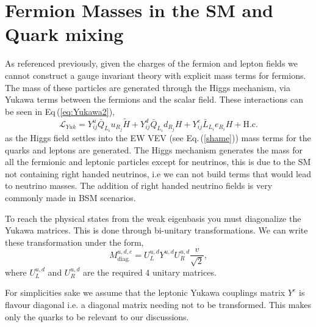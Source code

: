 \renewcommand{\cleardoublepage}{}
\renewcommand{\clearpage}{}

\section{Fermion Masses in the SM and Quark mixing}
\label{Chap_1_Sec_3}

As referenced previously, given the charges of the fermion and lepton fields we cannot construct a gauge invariant theory with explicit mass terms for fermions. 
%
The mass of these particles are generated through the Higgs mechanism, via Yukawa terms between the fermions and the scalar field. 
%
These interactions can be seen in Eq\,(\ref{eq:Yukawa2}), 
%
\begin{equation} 
\label{eq:Yukawa2}
\mathcal{L}_{Yuk} = Y^u_{ij} \bar{Q}_{L_i} u_{R_j}  \tilde{H} + Y^d_{ij} \bar{Q}_{L_i}  d_{R_j} H  + Y^e_{ij} \bar{L}_{L_i}  e_{R_i} H + \text{H.c.} 
\end{equation} 
%
as the Higgs field settles into the EW VEV (see Eq.\,(\ref{shame})) mass terms for the quarks and leptons are generated. 
%
The Higgs mechanism generates the mass for all the fermionic and leptonic particles except for neutrinos, this is due to the SM not containing right handed neutrinos, i.e we can not build terms that would lead to neutrino masses.
% 
The addition of right handed neutrino fields is very commonly made in BSM scenarios. 

To reach the physical states from the weak eigenbasis you must diagonalize the Yukawa matrices. This is done through bi-unitary transformations. 
% 
We can write these transformation under the form,
%
\begin{equation}
\label{YukawaMasses} 
M^{u,d,e}_{\text{diag.}}= U^{u,d}_L Y^{u,d} U^{u,d}_R \frac{v}{\sqrt{2}} , 
\end{equation} 
%
where $U^{u,d}_L$ and $U^{u,d}_R$ are the required 4 unitary matrices. 

%
%
For simplicities sake we assume that the leptonic Yukawa couplings matrix $Y^{e}$ is flavour diagonal i.e. a diagonal matrix needing not to be transformed. This makes only the quarks to be relevant to our discussions.  

